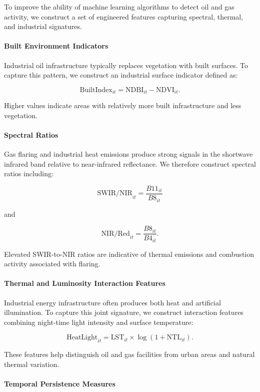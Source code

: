 \documentclass[12pt]{article}
\begin{document}
To improve the ability of machine learning algorithms to detect oil and gas activity, we construct a set of engineered features capturing spectral, thermal, and industrial signatures.

\paragraph{Built Environment Indicators}

Industrial oil infrastructure typically replaces vegetation with built surfaces. To capture this pattern, we construct an industrial surface indicator defined as:

\[
\text{BuiltIndex}_{it} = \text{NDBI}_{it} - \text{NDVI}_{it}.
\]

Higher values indicate areas with relatively more built infrastructure and less vegetation.

\paragraph{Spectral Ratios}

Gas flaring and industrial heat emissions produce strong signals in the shortwave infrared band relative to near-infrared reflectance. We therefore construct spectral ratios including:

\[
\text{SWIR/NIR}_{it} = \frac{B11_{it}}{B8_{it}}
\]

and

\[
\text{NIR/Red}_{it} = \frac{B8_{it}}{B4_{it}}.
\]

Elevated SWIR-to-NIR ratios are indicative of thermal emissions and combustion activity associated with flaring.

\paragraph{Thermal and Luminosity Interaction Features}

Industrial energy infrastructure often produces both heat and artificial illumination. To capture this joint signature, we construct interaction features combining night-time light intensity and surface temperature:

\[
\text{HeatLight}_{it} = \text{LST}_{it} \times \log(1 + \text{NTL}_{it}).
\]

These features help distinguish oil and gas facilities from urban areas and natural thermal variation.

\paragraph{Temporal Persistence Measures}
\end{document}
